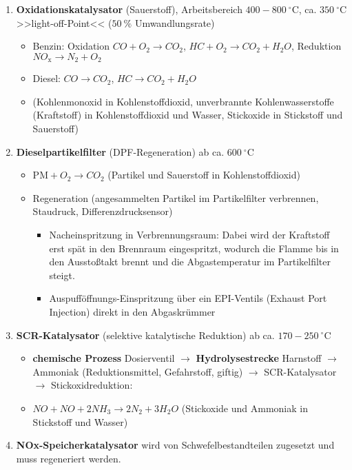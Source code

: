 \begin{enumerate}
\item
  \textbf{Oxidationskatalysator} (Sauerstoff), Arbeitsbereich
  $400 - 800~^\circ\text{C}$, ca. $350~^\circ\text{C}$
  >>light-off-Point<< ($50~\%$ Umwandlungsrate)

  \begin{itemize}
  \item
    Benzin: Oxidation $CO + O_2 \to CO_2$,
    $HC + O_2 \to CO_2 + H_{2}O$, Reduktion
    $NO_\text{x} \to N_2 + O_2$
  \item
    Diesel: $CO \to CO_2$, $HC \to CO_2 + H_{2}O$
  \item
    (Kohlenmonoxid in Kohlenstoffdioxid, unverbrannte Kohlenwasserstoffe
    (Kraftstoff) in Kohlenstoffdioxid und Wasser, Stickoxide in
    Stickstoff und Sauerstoff)
  \end{itemize}
\item
  \textbf{Dieselpartikelfilter} (DPF-Regeneration) ab ca.
  $600~^\circ\text{C}$

  \begin{itemize}
  \item
    $\text{PM} + O_2 \to CO_{2}$ (Partikel und Sauerstoff in
    Kohlenstoffdioxid)
  \item
    Regeneration (angesammelten Partikel im Partikelfilter verbrennen,
    Staudruck, Differenzdrucksensor)

    \begin{itemize}
    \item
      Nacheinspritzung in Verbrennungsraum: Dabei wird der Kraftstoff
      erst spät in den Brennraum eingespritzt, wodurch die Flamme bis in
      den Ausstoßtakt brennt und die Abgastemperatur im Partikelfilter
      steigt.
    \item
      Auspufföffnungs-Einspritzung über ein EPI-Ventils (Exhaust Port
      Injection) direkt in den Abgaskrümmer
    \end{itemize}
  \end{itemize}
\item
  \textbf{SCR-Katalysator} (selektive katalytische Reduktion) ab ca.
  $170 - 250~^\circ\text{C}$

  \begin{itemize}
  \item
    \textbf{chemische Prozess} Dosierventil $\to$
    \textbf{Hydrolysestrecke} Harnstoff $\to$ Ammoniak
    (Reduktionsmittel, Gefahrstoff, giftig) $\to$ SCR-Katalysator
    $\to$ Stickoxidreduktion:
  \item
    $NO + NO + 2NH_3 \to 2N_2 + 3H_{2}O$ (Stickoxide und Ammoniak in
    Stickstoff und Wasser)
  \end{itemize}
\item
  \textbf{NOx-Speicherkatalysator} wird von Schwefelbestandteilen
  zugesetzt und muss regeneriert werden.
\end{enumerate}

